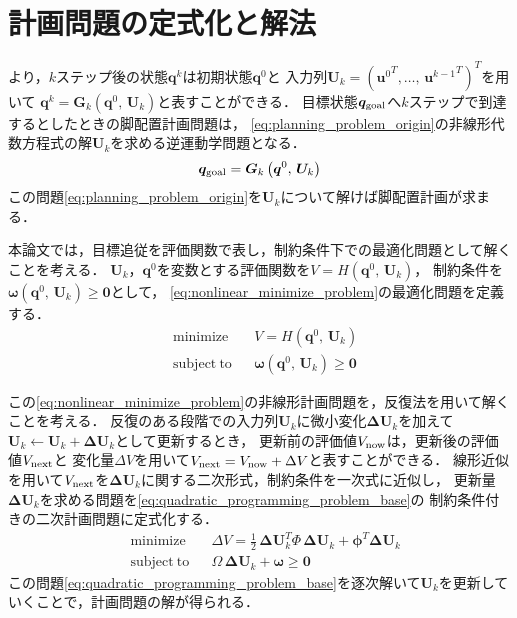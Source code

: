 \documentclass[autodetect-engine,dvipdfmx-if-dvi,ja=standard,a4j,jbase=11pt,magstyle=nomag*]{bxjsreport}
\begin{document}
\section{計画問題の定式化と解法}
より，$k$ステップ後の状態$\bm{q}^k$は初期状態$\bm{q}^0$と
入力列$\bm{U}_k = ( {\bm{u}^0}^T , \dots ,\, {\bm{u}^{k - 1}}^T )^T$を用いて
$\bm{q}^k = \bm{G}_k ( \bm{q}^0 ,\, \bm{U}_k )$と表すことができる．
目標状態$\bm{q}_{\mathrm{goal}}$へ$k$ステップで到達するとしたときの脚配置計画問題は，
\cref{eq:planning_problem_origin}の非線形代数方程式の解$\bm{U}_k$を求める逆運動学問題となる．
\begin{equation} \label{eq:planning_problem_origin}
    \bm{q}_{\mathrm{goal}} = \bm{G}_k \left( \bm{q}^0 ,\, \bm{U}_k \right)
\end{equation}
この問題\cref{eq:planning_problem_origin}を$\bm{U}_k$について解けば脚配置計画が求まる．

本論文では，目標追従を評価関数で表し，制約条件下での最適化問題として解くことを考える．
$\bm{U}_k$，$\bm{q}^0$を変数とする評価関数を$V = H ( \bm{q}^0 ,\, \bm{U}_k )$，
制約条件を$\bm{\omega} ( \bm{q}^0 ,\, \bm{U}_k ) \geq \bm{0}$として，
\cref{eq:nonlinear_minimize_problem}の最適化問題を定義する．
\begin{equation} \label{eq:nonlinear_minimize_problem}
    \begin{aligned}
        & \mathrm{minimize} && V = H \left( \bm{q}^0 ,\, \bm{U}_k \right) \\
        & \mathrm{subject~to} && \bm{\omega} \left( \bm{q}^0 ,\, \bm{U}_k \right) \geq \bm{0}
    \end{aligned}
\end{equation}

この\cref{eq:nonlinear_minimize_problem}の非線形計画問題を，反復法を用いて解くことを考える．
反復のある段階での入力列$\bm{U}_k$に微小変化$\bm{\Delta U}_k$を加えて$\bm{U}_k \gets \bm{U}_k + \bm{\Delta U}_k$として更新するとき，
更新前の評価値$V_{\mathrm{now}}$は，更新後の評価値$V_{\mathrm{next}}$と
変化量$\Delta V$を用いて$V_{\mathrm{next}} = V_{\mathrm{now}} + \Delta V$と表すことができる．
線形近似を用いて$V_{\mathrm{next}}$を$\bm{\Delta U}_k$に関する二次形式，制約条件を一次式に近似し，
更新量$\bm{\Delta U}_k$を求める問題を\cref{eq:quadratic_programming_problem_base}の
制約条件付きの二次計画問題に定式化する．
\begin{equation} \label{eq:quadratic_programming_problem_base}
    \begin{aligned}
        & \mathrm{minimize} && \Delta V = \frac{1}{2} \, \bm{\Delta U}_k^T \varPhi \, \bm{\Delta U}_k + \bm{\phi}^T \bm{\Delta U}_k \\
        & \mathrm{subject~to} && \varOmega \, \bm{\Delta U}_k + \bm{\omega} \geq \bm{0}
    \end{aligned}
\end{equation}
この問題\cref{eq:quadratic_programming_problem_base}を逐次解いて$\bm{U}_k$を更新していくことで，計画問題の解が得られる．
\end{document}
